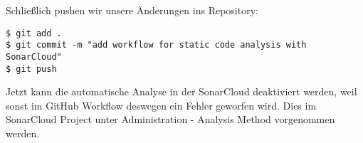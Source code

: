 \noindent
Schließlich pushen wir unsere Änderungen ins Repository:

\begin{verbatim}
$ git add .
$ git commit -m "add workflow for static code analysis with SonarCloud"
$ git push
\end{verbatim}

\noindent
Jetzt kann die automatische Analyse in der SonarCloud
deaktiviert werden, weil sonst im GitHub Workflow
deswegen ein Fehler geworfen wird. Dies
im SonarCloud Project unter Administration - Analysis Method
vorgenommen werden.







